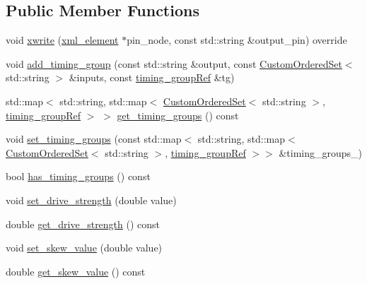\subsection*{Public Member Functions}
\begin{DoxyCompactItemize}
\item 
void \hyperlink{classliberty__model_ac02327c2851bea22b94377da3b0b689a}{xwrite} (\hyperlink{classxml__element}{xml\+\_\+element} $\ast$pin\+\_\+node, const std\+::string \&output\+\_\+pin) override
\item 
void \hyperlink{classliberty__model_a446d66ba13043a60d0fe9a5579a7327b}{add\+\_\+timing\+\_\+group} (const std\+::string \&output, const \hyperlink{classCustomOrderedSet}{Custom\+Ordered\+Set}$<$ std\+::string $>$ \&inputs, const \hyperlink{timing__group_8hpp_a343803fe4e1a65fd6b57b504c2ed67ca}{timing\+\_\+group\+Ref} \&tg)
\item 
std\+::map$<$ std\+::string, std\+::map$<$ \hyperlink{classCustomOrderedSet}{Custom\+Ordered\+Set}$<$ std\+::string $>$, \hyperlink{timing__group_8hpp_a343803fe4e1a65fd6b57b504c2ed67ca}{timing\+\_\+group\+Ref} $>$ $>$ \hyperlink{classliberty__model_ab261d605fb151cd7bafe4e4185a64e99}{get\+\_\+timing\+\_\+groups} () const
\item 
void \hyperlink{classliberty__model_a2ee7986501fabaf63a98e36e3462b034}{set\+\_\+timing\+\_\+groups} (const std\+::map$<$ std\+::string, std\+::map$<$ \hyperlink{classCustomOrderedSet}{Custom\+Ordered\+Set}$<$ std\+::string $>$, \hyperlink{timing__group_8hpp_a343803fe4e1a65fd6b57b504c2ed67ca}{timing\+\_\+group\+Ref} $>$$>$ \&timing\+\_\+groups\+\_\+)
\item 
bool \hyperlink{classliberty__model_ab2955a2bc5546c99fa44092e349cd20e}{has\+\_\+timing\+\_\+groups} () const
\item 
void \hyperlink{classliberty__model_a7733787e96dda82f8b979f6d8d384e70}{set\+\_\+drive\+\_\+strength} (double value)
\item 
double \hyperlink{classliberty__model_afb9af1e67d10795cb89550a5e4ed68fb}{get\+\_\+drive\+\_\+strength} () const
\item 
void \hyperlink{classliberty__model_a3a8b190bacc727338344db57a5916329}{set\+\_\+skew\+\_\+value} (double value)
\item 
double \hyperlink{classliberty__model_a359f25f0b8be48227ebbd87f4727f1a2}{get\+\_\+skew\+\_\+value} () const
\end{DoxyCompactItemize}
